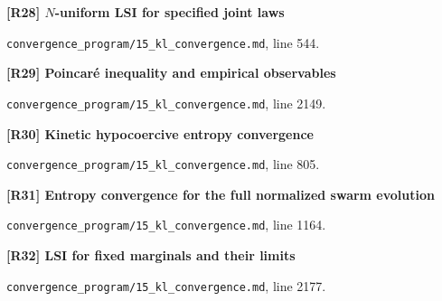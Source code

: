 \documentclass[11pt,a4paper]{article}
\begin{document}
\par\medskip\noindent\begin{minipage}{\linewidth}\textbf{[R28] \(N\)-uniform LSI for specified joint laws}\label{src:cor-n-uniform-lsi}\par
{\small\texttt{}\par
\nolinkurl{convergence_program/15_kl_convergence.md}, line 544.\par}
\end{minipage}\par

\par\medskip\noindent\begin{minipage}{\linewidth}\textbf{[R29] Poincaré inequality and empirical observables}\label{src:cor-quantitative-lsi-final}\par
{\small\texttt{}\par
\nolinkurl{convergence_program/15_kl_convergence.md}, line 2149.\par}
\end{minipage}\par

\par\medskip\noindent\begin{minipage}{\linewidth}\textbf{[R30] Kinetic hypocoercive entropy convergence}\label{src:thm-villani-hypocoercivity}\par
{\small\texttt{}\par
\nolinkurl{convergence_program/15_kl_convergence.md}, line 805.\par}
\end{minipage}\par

\par\medskip\noindent\begin{minipage}{\linewidth}\textbf{[R31] Entropy convergence for the full normalized swarm evolution}\label{src:thm-kl-convergence-euclidean}\par
{\small\texttt{}\par
\nolinkurl{convergence_program/15_kl_convergence.md}, line 1164.\par}
\end{minipage}\par

\par\medskip\noindent\begin{minipage}{\linewidth}\textbf{[R32] LSI for fixed marginals and their limits}\label{src:cor-kl-lsi-mean-field-limit}\par
{\small\texttt{}\par
\nolinkurl{convergence_program/15_kl_convergence.md}, line 2177.\par}
\end{minipage}\par
\end{document}
